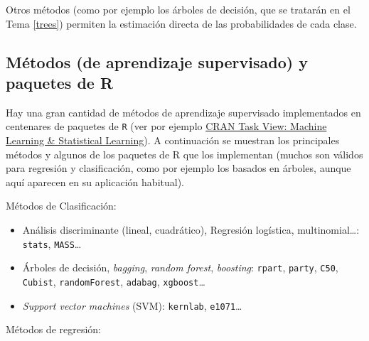 \documentclass[
  spanish,
]{book}
\theoremstyle{break}
\theoremstyle{definition}
\theoremstyle{definition}
\theoremstyle{definition}
\theoremstyle{definition}
\theoremstyle{remark}
\begin{document}
Otros métodos (como por ejemplo los árboles de decisión, que se tratarán en el Tema \ref{trees}) permiten la estimación directa de las probabilidades de cada clase.

\hypertarget{metodos-pkgs}{%
\subsection{Métodos (de aprendizaje supervisado) y paquetes de R}\label{metodos-pkgs}}

Hay una gran cantidad de métodos de aprendizaje supervisado implementados en centenares de paquetes de \texttt{R} (ver por ejemplo \href{https://cran.r-project.org/web/views/MachineLearning.html}{CRAN Task View: Machine Learning \& Statistical Learning}).
A continuación se muestran los principales métodos y algunos de los paquetes de R que los implementan (muchos son válidos para regresión y clasificación, como por ejemplo los basados en árboles, aunque aquí aparecen en su aplicación habitual).

Métodos de Clasificación:

\begin{itemize}
\item
  Análisis discriminante (lineal, cuadrático), Regresión logística, multinomial\ldots:
  \texttt{stats}, \texttt{MASS}\ldots{}
\item
  Árboles de decisión, \emph{bagging}, \emph{random forest}, \emph{boosting}:
  \texttt{rpart}, \texttt{party}, \texttt{C50}, \texttt{Cubist}, \texttt{randomForest}, \texttt{adabag}, \texttt{xgboost}\ldots{}
\item
  \emph{Support vector machines} (SVM):
  \texttt{kernlab}, \texttt{e1071}\ldots{}
\end{itemize}

Métodos de regresión:
\end{document}

